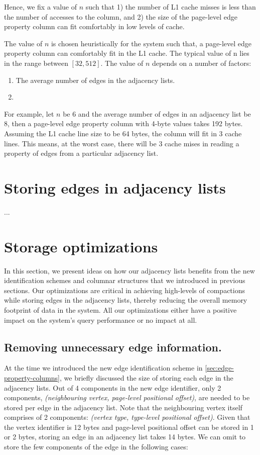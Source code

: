 Hence, we fix a value of $n$ such that 1) the number of L1 cache misses is less than the number of accesses to the column, and 2) the size of the page-level edge property column can fit comfortably in low levels of cache.

The value of $n$ is chosen heuristically for the system such that, a page-level edge property column can comfortably fit in the L1 cache. The typical value of n lies in the range between $[32, 512]$. The value of $n$ depends on a number of factors: 
\begin{enumerate}
	\item The average number of edges in the adjacency lists.
	\item  
\end{enumerate} 


For example, let $n$ be 6 and the average number of edges in an adjacency list be 8, then a page-level edge property column with 4-byte values takes 192 bytes. Assuming the L1 cache line size to be 64 bytes, the column will fit in 3 cache lines. This means, at the worst case, there will be 3 cache mises in reading a property of edges from a particular adjacency list.

\section{Storing edges in adjacency lists}
\label{sec:adjacency-lists}

...

\section{Storage optimizations}
\label{sec:storage-optimizations}

In this section, we present ideas on how our adjacency lists benefits from the new identification schemes and columnar structures that we introduced in previous sections. Our optimizations are critical in achieving high-levels of compactions while storing edges in the adjacency lists, thereby reducing the overall memory footprint of data in the system. All our optimizations either have a positive impact on the system's query performance or no impact at all.

\subsection{Removing unnecessary edge information.}

At the time we introduced the new edge identification scheme in \ref{sec:edge-property-columns}, we briefly discussed the size of storing each edge in the adjacency lists. Out of 4 components in the new edge identifier, only 2 components, \emph{(neighbouring vertex, page-level positional offset)}, are needed to be stored per edge in the adjacency list. Note that the neighbouring vertex itself comprises of 2 components: \emph{(vertex type, type-level positional offset)}. Given that the vertex identifier is 12 bytes and page-level positional offset can be stored in 1 or 2 bytes, storing an edge in an adjacency list takes 14 bytes. We can omit to store the few components of the edge in the following cases: 

